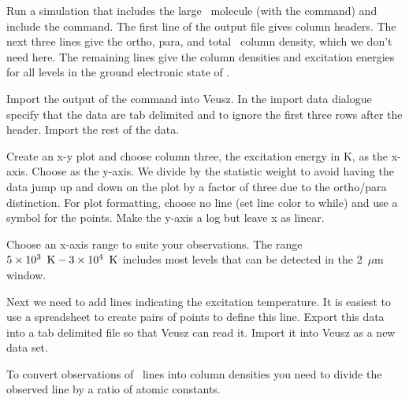 \documentclass[12pt,twoside]{article}
\begin{document}
Run a simulation that includes the large \htwo\ molecule (with the  command)
and include the  command.
The first line of the  output file gives column headers.
The next three lines give the ortho, para, and total \htwo\ column density,
which we don't need here.
The remaining lines give the column densities and excitation energies for all levels
in the ground electronic state of \htwo.

Import the output of the  command into Veusz.
In the import data dialogue specify that the data are tab delimited and to ignore the first three
rows after the header.
Import the rest of the data.

Create an x-y plot and choose column three, the excitation energy in K, as the x-axis.
Choose  as the y-axis.
We divide by the statistic weight to avoid having the data jump up and down on the plot
by a factor of three due to the ortho/para distinction.
For plot formatting, choose no line (set line color to while) and use a symbol for the points.
Make the y-axis a log but leave x as linear.

Choose an x-axis range to suite your observations.  The range $5\times 10^{3}~{\rm\thinspace K} - 3\times 10^{4}~{\rm\thinspace K}$ includes
most levels that can be detected in the 2~$\mu$m window.

Next we need to add lines indicating the excitation temperature.  
It is easiest to use a spreadsheet to create pairs of points to define this line.
Export this data into a tab delimited file so that Veusz can read it.
Import it into Veusz as a new data set.

To convert observations of \htwo\ lines into column densities you need to divide the observed line by 
a ratio of atomic constants.




\pagebreak
\appendix

\end{document}

